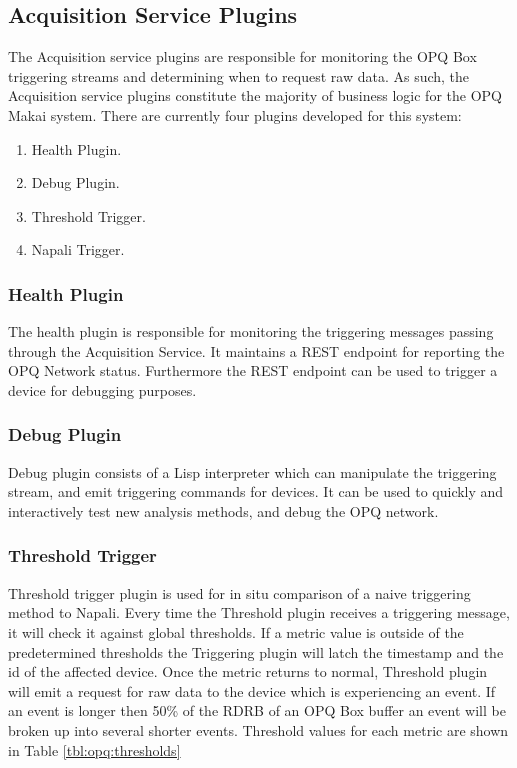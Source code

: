\subsection{Acquisition Service Plugins}\label{subsec:acquisition-service-plugins}

The Acquisition service plugins are responsible for monitoring the OPQ Box triggering streams and determining when to request raw data.
As such, the Acquisition service plugins constitute the majority of business logic for the OPQ Makai system.
There are currently four plugins developed for this system:
\begin{enumerate}
	\item Health Plugin.
	\item Debug Plugin.
	\item Threshold Trigger.
	\item Napali Trigger.
\end{enumerate}

\subsubsection{Health Plugin}

The health plugin is responsible for monitoring the triggering messages passing through the Acquisition Service.
It maintains a REST endpoint for reporting the OPQ Network status.
Furthermore the REST endpoint can be used to trigger a device for debugging purposes.

\subsubsection{Debug Plugin}
Debug plugin consists of a Lisp interpreter which can manipulate the triggering stream, and emit triggering commands for devices.
It can be used to quickly and interactively test new analysis methods, and debug the OPQ network.

\subsubsection{Threshold Trigger}
Threshold trigger plugin is used for in situ comparison of a naive triggering method to Napali.
Every time the Threshold plugin receives a triggering message, it will check it against global thresholds.
If a metric value is outside of the predetermined thresholds the Triggering plugin will latch the timestamp and the id of the affected device.
Once the metric returns to normal, Threshold plugin will emit a request for raw data to the device which is experiencing an event.
If an event is longer then 50\% of the RDRB of an OPQ Box buffer an event will be broken up into several shorter events.
Threshold values for each metric are shown in Table \ref{tbl:opq:thresholds}

